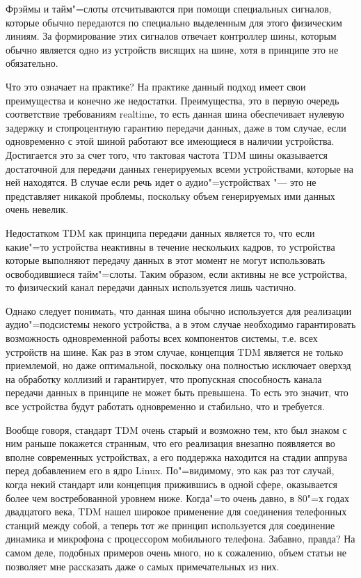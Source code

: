 \documentclass[10pt, a5paper]{article}
\begin{document}
Фрэймы и тайм"=слоты отсчитываются при помощи специальных сигналов, которые
обычно передаются по специально выделенным для этого физическим линиям. За
формирование этих сигналов отвечает контроллер шины, которым обычно
является одно из устройств висящих на шине, хотя в принципе это не
обязательно.

Что это означает на практике? На практике данный подход имеет свои
преимущества и конечно же недостатки. Преимущества, это в первую очередь
соответствие требованиям realtime, то есть данная шина обеспечивает
нулевую задержку и стопроцентную гарантию передачи данных, даже в том
случае, если одновременно с этой шиной работают все имеющиеся в наличии
устройства. Достигается это за счет того, что тактовая частота TDM шины
оказывается достаточной для передачи данных генерируемых всеми
устройствами, которые на ней находятся. В случае если речь идет о
аудио"=устройствах "--- это не представляет никакой проблемы, поскольку объем
генерируемых ими данных очень невелик.

Недостатком TDM как принципа передачи данных является то, что если
какие"=то устройства неактивны в течение нескольких кадров, то устройства
которые выполняют передачу данных в этот момент не могут использовать
освободившиеся тайм"=слоты. Таким образом, если активны не все устройства,
то физический канал передачи данных используется лишь частично.

Однако следует понимать, что данная шина обычно используется для
реализации аудио"=подсистемы некого устройства, а в этом случае необходимо
гарантировать возможность одновременной работы всех компонентов системы,
т.е. всех устройств на шине. Как раз в этом случае, концепция TDM является
не только приемлемой, но даже оптимальной, поскольку она полностью
исключает оверхэд на обработку коллизий и гарантирует, что пропускная
способность канала передачи данных в принципе не может быть превышена. То
есть это значит, что все устройства будут работать одновременно и
стабильно, что и требуется.

Вообще говоря, стандарт TDM очень старый и возможно тем, кто был знаком с
ним раньше покажется странным, что его реализация внезапно появляется во
вполне современных устройствах, а его поддержка находится на стадии
аппрува перед добавлением его в ядро Linux. По"=видимому, это как раз тот
случай, когда некий стандарт или концепция прижившись в одной сфере,
оказывается более чем востребованной уровнем ниже. Когда"=то очень давно, в
80"=х годах двадцатого века, TDM нашел широкое применение для соединения
телефонных станций между собой, а теперь тот же принцип используется для
соединение динамика и микрофона с процессором мобильного телефона.
Забавно, правда? На самом деле, подобных примеров очень много, но к
сожалению, объем статьи не позволяет мне рассказать даже о самых
примечательных из них.
\end{document}
